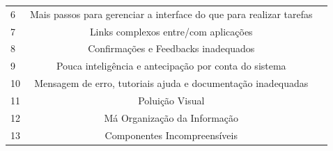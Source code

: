 \begin{table}[]
\begin{tabular}{|l|c|l|l|l|l|l|}
		6                        & \multicolumn{5}{c|}{Mais   passos para gerenciar a interface do que para realizar tarefas}                 &                                                                                                                                                        \\ \cline{1-6}
		7                        & \multicolumn{5}{c|}{Links   complexos entre/com aplicações}                                                &                                                                                                                                                        \\ \cline{1-6}
		8                        & \multicolumn{5}{c|}{Confirmações   e Feedbacks inadequados}                                                &                                                                                                                                                        \\ \cline{1-6}
		9                        & \multicolumn{5}{c|}{Pouca   inteligência e antecipação por conta do sistema}                               &                                                                                                                                                        \\ \cline{1-6}
		10                       & \multicolumn{5}{c|}{Mensagem   de erro, tutoriais ajuda e documentação inadequadas}                        &                                                                                                                                                        \\ \cline{1-6}
		\multicolumn{1}{|c|}{11} & \multicolumn{5}{c|}{Poluição Visual}                                                                       &                                                                                                                                                        \\ \cline{1-6}
		\multicolumn{1}{|c|}{12} & \multicolumn{5}{c|}{Má Organização da Informação}                                                          &                                                                                                                                                        \\ \cline{1-6}
		\multicolumn{1}{|c|}{13} & \multicolumn{5}{c|}{Componentes Incompreensíveis}                                                          &                                                                                                                                                        \\ \cline{1-6}

\end{tabular}
\end{table}

